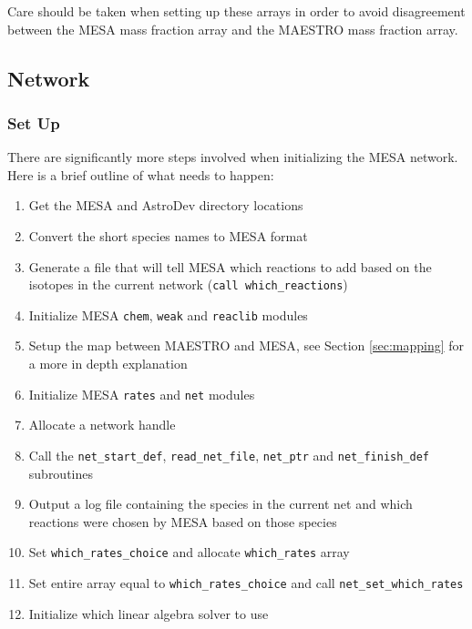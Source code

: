 Care should be taken when setting up these arrays in order to avoid 
disagreement between the {\sf MESA} mass fraction array and the {\sf MAESTRO} 
mass fraction array. 

\subsection{Network}

\subsubsection{Set Up}

There are significantly more steps involved when initializing the {\sf MESA} 
network. Here is a brief outline of what needs to happen:
\begin{enumerate}
\item Get the {\sf MESA} and {\sf AstroDev} directory locations
\item Convert the short species names to {\sf MESA} format
\item Generate a file that will tell {\sf MESA} which reactions to add based 
on the isotopes in the current network ({\tt call which\_reactions})
\item Initialize {\sf MESA} {\tt chem}, {\tt weak} and {\tt reaclib} modules
\item Setup the map between {\sf MAESTRO} and {\sf MESA}, see Section 
\ref{sec:mapping} for a more in depth explanation
\item Initialize {\sf MESA} {\tt rates} and {\tt net} modules
\item Allocate a network handle
\item Call the {\tt net\_start\_def}, {\tt read\_net\_file}, {\tt net\_ptr} 
and {\tt net\_finish\_def} subroutines
\item Output a log file containing the species in the current net and which 
reactions were chosen by {\sf MESA} based on those species
\item Set {\tt which\_rates\_choice} and allocate {\tt which\_rates} array
\item Set entire array equal to {\tt which\_rates\_choice} and call 
{\tt net\_set\_which\_rates}
\item Initialize which linear algebra solver to use
\end{enumerate}

